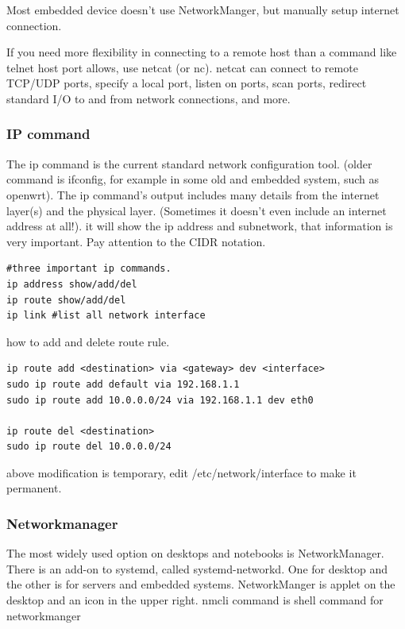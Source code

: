 \documentclass[paper=8.5in:11in, twoside, 12pt, pagesize=pdftex]{book}
\begin{document}
	\par Most embedded device doesn't use NetworkManger, but manually setup internet connection. 

	\par If you need more flexibility in connecting to a remote host than a command like telnet host port allows, use netcat (or nc). netcat can connect to remote TCP/UDP ports, specify a local port, listen on ports, scan ports, redirect standard I/O to and from network connections, and more.


\subsubsection{IP command}

	\par The ip command is the current standard network configuration tool. (older command is ifconfig, for example in some old and embedded system, such as openwrt). The ip command’s output includes many details from the internet layer(s) and the physical layer. (Sometimes it doesn’t even include an internet address at all!). it will show the ip address and subnetwork, that information is very important. Pay attention to the CIDR notation. 
\begin{lstlisting}
#three important ip commands. 
ip address show/add/del
ip route show/add/del
ip link #list all network interface 
\end{lstlisting}

	\par how to add and delete route rule.
\begin{lstlisting}
ip route add <destination> via <gateway> dev <interface>
sudo ip route add default via 192.168.1.1
sudo ip route add 10.0.0.0/24 via 192.168.1.1 dev eth0

ip route del <destination>
sudo ip route del 10.0.0.0/24
\end{lstlisting}
above modification is temporary, edit /etc/network/interface to make it permanent. 

\subsubsection{Networkmanager}
\par The most widely used option on desktops and notebooks is NetworkManager. There is an add-on to systemd, called systemd-networkd. One for desktop and the other is for servers and embedded systems. NetworkManger is applet on the desktop and an icon in the upper right. nmcli command is shell command for networkmanger
\end{document}
